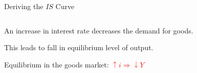 \documentclass[shownotes,11pt, aspectratio=169]{beamer}
\newenvironment{wideitemize}{\itemize\addtolength{\itemsep}{10pt}}{\enditemize}
\begin{document}
\begin{frame}{Deriving the $IS$ Curve}
\begin{columns}[T] %
\begin{column}{.44\textwidth}
  \begin{wideitemize}
    \item An increase in interest rate decreases the demand for goods.
    \item This leads to fall in equilibrium level of output.
    \pause
    \item Equilibrium in the goods market: \textcolor{red}{$\uparrow i \Rightarrow \downarrow Y$}
  \end{wideitemize}
\end{column}%
\pause
\hfill%
\begin{column}{.53\textwidth}
\end{column}%
\end{columns}
\end{frame}
\end{document}
